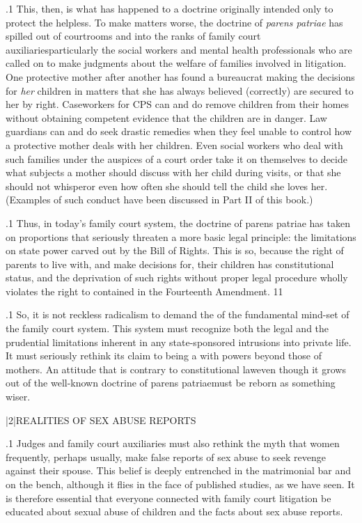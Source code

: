 \documentclass[11pt, twoside]{article}
\begin{document}
{\p.1{%
This, then, is what has happened to a doctrine originally intended
only to protect the helpless. To make matters worse, the doctrine of
\textit{parens patriae} has spilled out of courtrooms and into the ranks of family court auxiliaries\mdash{}particularly the social workers and mental health
professionals who are called on to make judgments about the welfare
of families involved in litigation. One protective mother after another
has found a bureaucrat making the decisions for \textit{her} children in matters that she has always believed (correctly) are secured to her by right.
Caseworkers for CPS can and do remove children from their homes
without obtaining competent evidence that the children are in danger.
Law guardians can and do seek drastic remedies when they feel unable
to control how a protective mother deals with her children. Even social
workers who deal with such families under the auspices of a court order
take it on themselves to decide what subjects a mother should discuss
with her child during visits, or that she should not whisper\mdash{}or even how
often she should tell the child she loves her. (Examples of such conduct
have been discussed in Part II of this book.)
}%

\p.1{%
Thus, in today’s family court system, the doctrine of parens patriae
has taken on proportions that seriously threaten a more basic legal principle: the limitations on state power carved out by the Bill of Rights.
This is so, because the right of parents to live with, and make decisions
for, their children has constitutional status, and the deprivation of such
rights without proper legal procedure wholly violates the right to  contained in the Fourteenth Amendment. 11
}%

\p.1{%
So, it is not reckless radicalism to demand the  of the
fundamental mind-set of the family court system. This system must
recognize both the legal and the prudential limitations inherent in any
state-sponsored intrusions into private life. It must seriously rethink its
claim to being a  with powers beyond those of mothers.
An attitude that is contrary to constitutional law\mdash{}even though it grows
out of the well-known doctrine of parens patriae\mdash{}must be reborn as
something wiser.
}%


\s|2|{REALITIES OF SEX ABUSE REPORTS}

\p.1{%
\noindent{}Judges and family court auxiliaries must also rethink the myth that
women frequently, perhaps usually, make false reports of sex abuse to
seek revenge against their spouse. This belief is deeply entrenched in
the matrimonial bar and on the bench, although it flies in the face of
published studies, as we have seen. It is therefore essential that everyone
connected with family court litigation be educated about sexual abuse
of children and the facts about sex abuse reports.
}%

}
\end{document}
